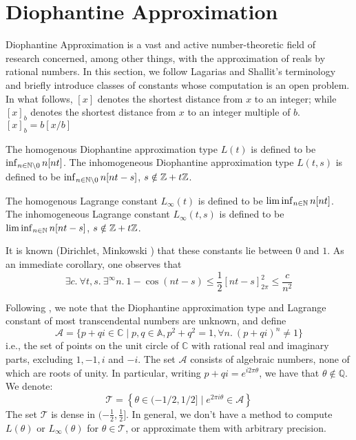\section{Diophantine Approximation}
\label{section:diophantine}

Diophantine Approximation is a vast and active number-theoretic field of research concerned, among other things, with the approximation of reals by rational numbers. In this section, we follow Lagarias and Shallit’s terminology \cite{dio-constants} and briefly introduce classes of constants whose computation is an open problem. In what follows, $[x]$ denotes the shortest distance from $x$ to an integer; while $[x]_b$ denotes the shortest distance from $x$ to an integer multiple of $b$. $[x]_b = b[x/b]$

\begin{definition}
\label{def:L}
The homogenous Diophantine approximation type $L(t)$ is defined to be $\inf_{n \in \mathbb{N} \backslash{0}} n[nt]$. The inhomogeneous Diophantine approximation type $L(t, s)$ is defined to be $\inf_{n \in \mathbb{N} \backslash{0}} n[nt - s]$, $s \notin \mathbb{Z} + t\mathbb{Z}$. 
\end{definition} 

\begin{definition}
\label{def:Linfty}
The homogenous Lagrange constant $L_\infty(t)$ is defined to be $\liminf_{n \in \mathbb{N}} n[nt]$. The inhomogeneous Lagrange constant $L_\infty(t, s)$ is defined to be\\ $\liminf_{n \in \mathbb{N}} n[nt - s]$, $s \notin \mathbb{Z} + t\mathbb{Z}$.
\end{definition} 

It is known (Dirichlet, Minkowski \cite{minkowski}) that these constants lie between $0$ and $1$. As an immediate corollary, one observes that
\begin{equation}
\label{eq:quadraticdecay}
\exists c.~\forall t, s.~ \exists^\infty n. ~ 1 - \cos(nt - s) \le \frac{1}{2}\left[nt - s \right]_{2\pi}^2 \le \frac{c}{n^2}
\end{equation}

Following \cite{joeljames3}, we note that the Diophantine approximation type and Lagrange constant of most transcendental numbers are unknown, and define
\begin{equation}
\mathcal A=\{p+q i \in \mathbb{C} \mid p,q \in \mathbb{A}, p^2+q^2=1, \forall n.~(p + qi)^n \ne 1\}
\end{equation}
i.e., the set of points on the unit circle of $\mathbb{C}$ with rational real and imaginary parts, excluding $1,-1, i$ and $-i$. The set $\mathcal A$ consists of algebraic numbers, none of which are roots of unity. In particular, writing $p+q i= e^{i 2 \pi \theta}$, we have that $\theta \notin \mathbb{Q}$. We denote:
\begin{equation}
\label{eq:keyset}
\mathcal{T} = \left\{ \theta \in (- 1/2, 1/2] \mid e^{2 \pi i \theta} \in \mathcal{A}\right\}
\end{equation}
The set $\mathcal{T}$ is dense in $(- \frac 1 2, \frac 1 2]$. In general, we don't have a method to compute $L(\theta)$ or $L_\infty(\theta)$ for $\theta \in \mathcal{T}$, or approximate them with arbitrary precision.

